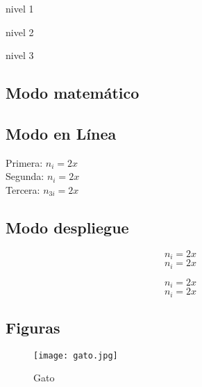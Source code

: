 \documentclass{article}
\begin{document}

     \begin{contract}
     \item nivel 1
       \begin{contract}
       \item nivel 2
         \begin{contract}
         \item nivel 3
         \end{contract}
       \end{contract}
     \end{contract}

     \subsection{Modo matemático}

     \subsection{Modo en Línea}

     Primera: $n_i = 2x$ \\
     Segunda: \(n_i = 2x\)\\
     Tercera: \begin{math} n_{3i} = 2x\end{math}
     \subsection{Modo despliegue}

     \[n_i = 2x\]
     \begin{equation}
       n_i = 2x
       \end{equation}

       $$n_i = 2x$$
\begin{equation*}
       n_i = 2x
       \end{equation*}

       \subsection{Figuras}


       \begin{figure}[hb]
         \centering
         \texttt{[image: gato.jpg]}
         \caption{Gato}
         \label{fig:gato}
       \end{figure}
\end{document}
